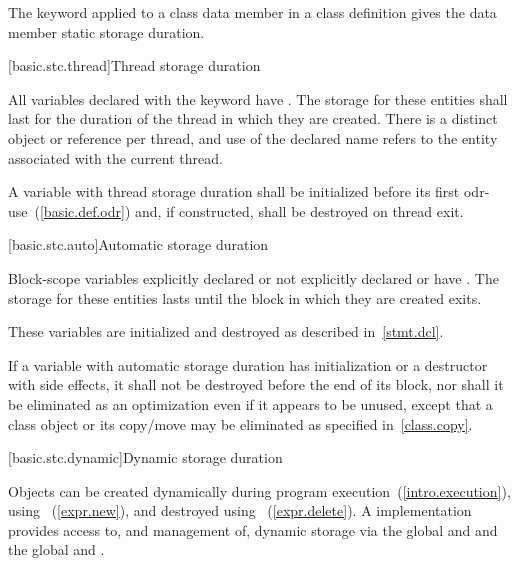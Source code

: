 \pnum
{}%
The keyword  applied to a class data member in a class
definition gives the data member static storage duration.

[basic.stc.thread]{Thread storage duration}

\pnum
{}%
All variables declared with the  keyword have . The storage for these entities shall last for the duration of
the thread in which they are created. There is a distinct object or reference
per thread, and use of the declared name refers to the entity associated with
the current thread.

\pnum
A variable with thread storage duration shall be initialized before
its first odr-use~(\ref{basic.def.odr}) and, if constructed, shall be destroyed on thread exit.

[basic.stc.auto]{Automatic storage duration}

\pnum
{}%
%
%
Block-scope variables explicitly declared  or
not explicitly declared  or  have
. The storage
for these entities lasts until the block in which they are created exits.

\pnum
\enternote 
These variables are initialized and destroyed as described in~\ref{stmt.dcl}.
\exitnote 

\pnum
If a variable with automatic storage duration has initialization or a destructor with side
effects, it shall not be destroyed before the end of its block, nor
shall it be eliminated as an optimization even if it appears to be
unused, except that a class object or its copy/move may be eliminated as
specified in~\ref{class.copy}.

[basic.stc.dynamic]{Dynamic storage duration}%

\pnum
Objects can be created dynamically during program
execution~(\ref{intro.execution}), using
%
~(\ref{expr.new}), and destroyed using
%
~(\ref{expr.delete}). A \Cpp implementation
provides access to, and management of, dynamic storage via the global
  and  and the global   and .

